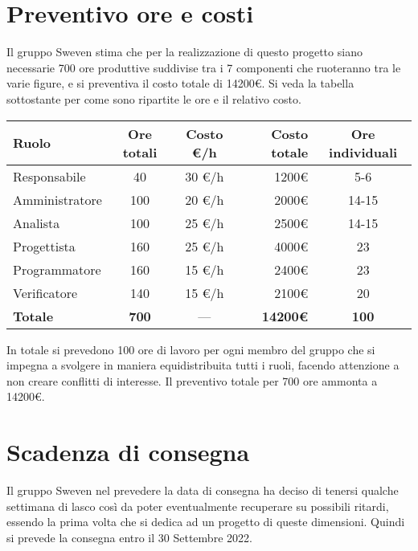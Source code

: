 \section{Preventivo ore e costi}
Il gruppo Sweven stima che per la realizzazione di questo progetto siano 
necessarie 700 ore produttive suddivise tra i 7 componenti che ruoteranno  
tra le varie figure, e si preventiva il costo totale di 14200\euro. \newline 
Si veda la tabella sottostante per come sono ripartite le ore e il relativo costo.
\begin{center}
	\renewcommand{\arraystretch}{1.8} %
	\begin{tabular}{ |l|c|c|r|c| }
	\hline
	\textbf{Ruolo} & \textbf{Ore totali} & \textbf{Costo \euro/h} &  \textbf{Costo totale} &  \textbf{Ore individuali} \\
	\hline
	Responsabile & 40 & 30 \euro/h & 1200\euro & 5-6\\
	\hline
    Amministratore & 100 & 20 \euro/h & 2000\euro & 14-15\\
	\hline
    Analista & 100 & 25 \euro/h & 2500\euro & 14-15\\
	\hline
    Progettista & 160 & 25 \euro/h & 4000\euro & 23\\
	\hline
    Programmatore & 160 & 15 \euro/h & 2400\euro & 23\\
	\hline
    Verificatore & 140 & 15 \euro/h & 2100\euro & 20\\
	\hline
    \textbf{Totale} & \textbf{700} & --- & \textbf{14200\euro} & \textbf{100}\\
	\hline
	\end{tabular}
\end{center}
In totale si prevedono 100 ore di lavoro per ogni membro del gruppo 
che si impegna a svolgere in maniera equidistribuita tutti i ruoli, 
facendo attenzione a non creare conflitti di interesse. \newline
Il preventivo totale per 700 ore ammonta a 14200\euro.

\section{Scadenza di consegna}
Il gruppo Sweven nel prevedere la data di consegna ha deciso di tenersi qualche 
settimana di lasco così da poter eventualmente recuperare su possibili ritardi, 
essendo la prima volta che si dedica ad un progetto di queste dimensioni. \newline
Quindi si prevede la consegna entro il 30 Settembre 2022.